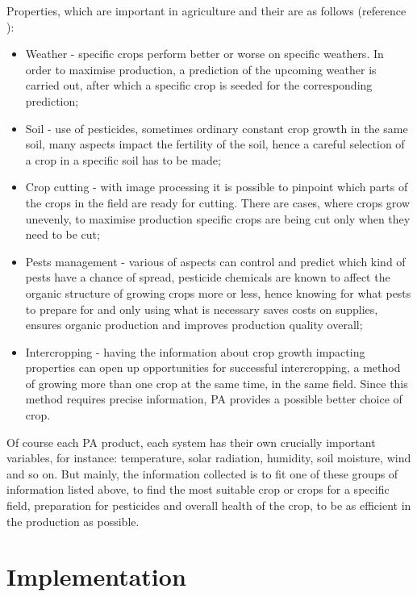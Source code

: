 \documentclass[11pt,a4paper,footinclude=true,headinclude=true, oneside]{scrbook}
\begin{document}
Properties, which are important in agriculture and their are as follows (reference \cite{lokhande_effective_2021}): 
\begin{itemize}
    \item Weather - specific crops perform better or worse on specific weathers. In order to maximise production, a prediction of the upcoming weather is carried out, after which a specific crop is seeded for the corresponding prediction;
    \item Soil - use of pesticides, sometimes ordinary constant crop growth in the same soil, many aspects impact the fertility of the soil, hence a careful selection of a crop in a specific soil has to be made;
    \item Crop cutting - with image processing it is possible to pinpoint which parts of the crops in the field are ready for cutting. There are cases, where crops grow unevenly, to maximise production specific crops are being cut only when they need to be cut;
    \item Pests management - various of aspects can control and predict which kind of pests have a chance of spread, pesticide chemicals are known to affect the organic structure of growing crops more or less, hence knowing for what pests to prepare for and only using what is necessary saves costs on supplies, ensures organic production and improves production quality overall;
    \item Intercropping - having the information about crop growth impacting properties can open up opportunities for successful intercropping, a method of growing more than one crop at the same time, in the same field. Since this method requires precise information, PA provides a possible better choice of crop.
\end{itemize}
Of course each PA product, each system has their own crucially important variables, for instance: temperature, solar radiation, humidity, soil moisture, wind and so on. But mainly, the  information collected is to fit one of these groups of information listed above, to find the most suitable crop or crops for a specific field, preparation for pesticides and overall health of the crop, to be as efficient in the production as possible. 
    
\section{Implementation}
\end{document}
